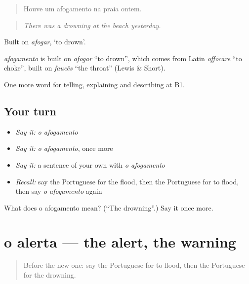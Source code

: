 \begin{quote}
Houve um afogamento na praia ontem.
\end{quote}

\begin{quote}
\emph{There was a drowning at the beach yesterday.}
\end{quote}

Built on \emph{afogar}, ‘to drown’.

\begin{cousinweb}
\emph{afogamento} is built on \emph{afogar} \textquotedblleft{}to drown\textquotedblright{}, which comes from Latin \emph{offōcāre} \textquotedblleft{}to choke\textquotedblright{}, built on \emph{faucēs} \textquotedblleft{}the throat\textquotedblright{} (Lewis \& Short).
\end{cousinweb}

\begin{grammarlens}[title={What you've built}]
One more word for telling, explaining and describing at B1.
\end{grammarlens}

\subsection*{Your turn}
\begin{itemize}
\raggedright
  \item \emph{Say it:} \emph{o afogamento}
  \item \emph{Say it:} \emph{o afogamento}, once more
  \item \emph{Say it:} a sentence of your own with \emph{o afogamento}
  \item \emph{Recall:} say the Portuguese for the flood, then the Portuguese for to flood, then say \emph{o afogamento} again
\end{itemize}

\begin{tcolorbox}[breakable,colback=teal!4,colframe=teal!35!black,title={Before you move on}]
What does o afogamento mean? (\textquotedblleft{}The drowning\textquotedblright{}.) Say it once more.
\end{tcolorbox}
\section[o alerta]{o alerta — the alert, the warning}

\label{lesson:PT-C303-alerta}



\begin{quote}
Before the new one: say the Portuguese for to flood, then the Portuguese for the drowning.
\end{quote}

